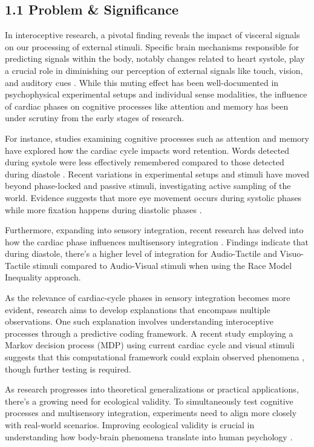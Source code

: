 \documentclass[12pt,oneside,openright]{report}
\begin{document}
\subsection*{1.1 Problem \& Significance}

In interoceptive research, a pivotal finding reveals the impact of visceral signals on our processing of external stimuli. Specific brain mechanisms responsible for predicting signals within the body, notably changes related to heart systole, play a crucial role in diminishing our perception of external signals like touch, vision, and auditory cues \parencite{esra_p, AL2021118247, Grund643, motyka, Park2014}. While this muting effect has been well-documented in psychophysical experimental setups and individual sense modalities, the influence of cardiac phases on cognitive processes like attention and memory has been under scrutiny from the early stages of research.

For instance, studies examining cognitive processes such as attention and memory have explored how the cardiac cycle impacts word retention. Words detected during systole were less effectively remembered compared to those detected during diastole \parencite{Garfinkel2013-st}. Recent variations in experimental setups and stimuli have moved beyond phase-locked and passive stimuli, investigating active sampling of the world. Evidence suggests that more eye movement occurs during systolic phases while more fixation happens during diastolic phases \parencite{GalvezPol2018ActiveSI}.

Furthermore, expanding into sensory integration, recent research has delved into how the cardiac phase influences multisensory integration \parencite{SALTAFOSSI2023108642}. Findings indicate that during diastole, there's a higher level of integration for Audio-Tactile and Visuo-Tactile stimuli compared to Audio-Visual stimuli when using the Race Model Inequality approach.

As the relevance of cardiac-cycle phases in sensory integration becomes more evident, research aims to develop explanations that encompass multiple observations. One such explanation involves understanding interoceptive processes through a predictive coding framework. A recent study employing a Markov decision process (MDP) using current cardiac cycle and visual stimuli suggests that this computational framework could explain observed phenomena \parencite{Allen2022}, though further testing is required.

As research progresses into theoretical generalizations or practical applications, there's a growing need for ecological validity. To simultaneously test cognitive processes and multisensory integration, experiments need to align more closely with real-world scenarios. Improving ecological validity is crucial in understanding how body-brain phenomena translate into human psychology \parencite{schmuckler2001ecological}.
\end{document}
